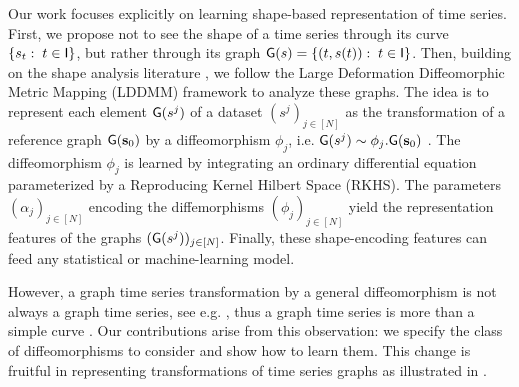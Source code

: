Our work focuses explicitly on learning shape-based representation of time series. First, we propose not to see the shape of a time series through its curve $\{s_t:\; t\in\mathsf{I}\}$, but rather through its graph $\mathsf{G}(s)=\{(t,s(t)):\; t\in \mathsf{I}\}$.
   Then, building on the shape analysis literature \cite{beg2005computing,vaillant2004statistics}, we follow the Large Deformation Diffeomorphic Metric Mapping (LDDMM) framework \cite{beg2005computing,vaillant2004statistics} to analyze these graphs. The idea is to represent each element $\mathsf{G}(s^j)$ of a dataset $(s^j)_{j\in[N]}$ as the transformation of a reference graph $\mathsf{G}(\mathbf{s}_0)$ by a diffeomorphism $\phi_j$, i.e. $\mathsf{G}(s^j) \sim \phi_j . \mathsf{G}(\mathbf{s}_0)$ .
    The diffeomorphism $\phi_j$ is learned by integrating an ordinary differential equation parameterized by a Reproducing Kernel Hilbert Space (RKHS).
     The parameters $(\alpha_j)_{j\in[N]}$ encoding the diffemorphisms $(\phi_j)_{j\in[N]}$ yield the representation features of the graphs $(\mathsf{G}(s^j))_{j\in[N]}$. Finally, these shape-encoding features can feed any statistical or machine-learning model.

However, a graph time series transformation by a general diffeomorphism is not always a graph time series, see e.g. , thus a graph time series is more than a simple curve \cite{glaunes2008large}.
 Our contributions arise from this observation: we specify the class of diffeomorphisms to consider and show how to learn them.
  This change is fruitful in representing transformations of time series graphs as illustrated in .

